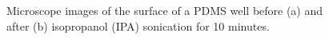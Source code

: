 \documentclass[
  a4paper,
]{scrbook}
\begin{document}
\begin{figure}
\begin{minipage}[t]{0.03\linewidth}
{\centering 


}

\end{minipage}%
%
\begin{minipage}[t]{0.01\linewidth}

{\centering 

~

}

\end{minipage}%
%
\begin{minipage}[t]{0.45\linewidth}

{\centering 


}

\end{minipage}%
%
\begin{minipage}[t]{0.01\linewidth}

{\centering 

~

}

\end{minipage}%

\caption{\label{fig-PDMS-clean}Microscope images of the surface of a
PDMS well before (a) and after (b) isopropanol (IPA) sonication for 10
minutes.}

\end{figure}
\end{document}
